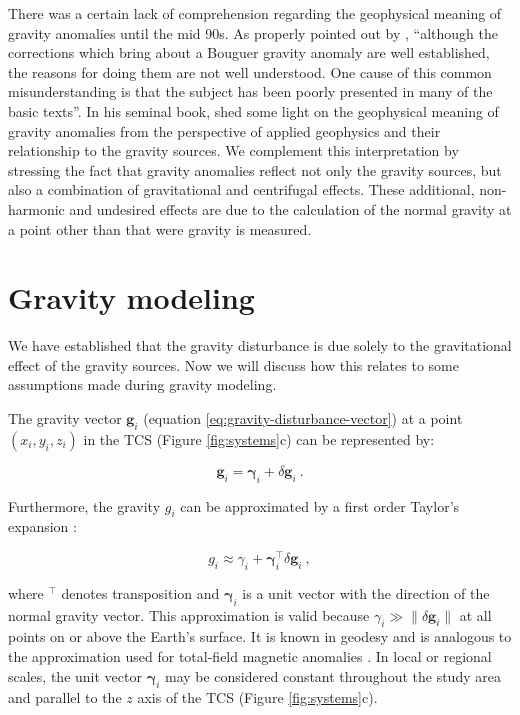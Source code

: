 \documentclass[paper,twocolumn,twoside]{geophysics}
\begin{document}
There was a certain lack of comprehension regarding the geophysical meaning of
gravity anomalies until the mid 90s.
As properly pointed out by \citet{chapin1996},
``although the corrections which bring about a Bouguer gravity anomaly are well
established, the reasons for doing them are not well understood. One cause of
this common misunderstanding is that the subject has been poorly presented in
many of the basic texts''.
In his seminal book, \citet{blakely1996} shed some light on the geophysical
meaning of gravity anomalies from the perspective of applied geophysics and
their relationship to the gravity sources.
We complement this interpretation by stressing the fact that
gravity anomalies reflect not only the gravity sources,
but also a combination of gravitational and centrifugal effects.
These additional, non-harmonic and undesired effects are due to the calculation
of the normal gravity at a point other than that were gravity is measured.


\section{Gravity modeling}

We have established that the gravity disturbance is due solely to the
gravitational effect of the gravity sources.
Now we will discuss how this relates to some assumptions made during gravity
modeling.

The gravity vector $\mathbf{g}_i$ (equation \ref{eq:gravity-disturbance-vector})
at a point $(x_i, y_i, z_i)$ in the TCS (Figure \ref{fig:systems}c) can be
represented by:

\begin{equation}
\mathbf{g}_i = \mathbf{\gamma}_i + \delta \mathbf{g}_i \: .
\label{eq:gravity-vector-TCS}
\end{equation}

\noindent
Furthermore, the gravity $g_i$ can be approximated by a first order Taylor's
expansion \citep{sanso_sideris2013}:

\begin{equation}
g_i \approx \gamma_i +
\mathbf{\gamma}_i^{\top} \delta \mathbf{g}_i \: ,
\label{eq:gobs-approx}
\end{equation}

\noindent
where $^{\top}$ denotes transposition and $\mathbf{\gamma}_{i}$ is a unit
vector with the direction of the normal gravity vector.
This approximation is valid because
$\gamma_{i} \gg \| \delta \mathbf{g}_{i} \|$ at all points on or above the
Earth's surface.
It is known in geodesy \citep[e.g.,][]{sanso_sideris2013}
and is analogous to the approximation used for
total-field magnetic anomalies \citep[e.g.,][]{blakely1996}.
In local or regional scales, the unit
vector $\mathbf{\gamma}_{i}$
may be considered constant throughout the study area and
parallel to the $z$ axis of the TCS (Figure \ref{fig:systems}c).
\end{document}
